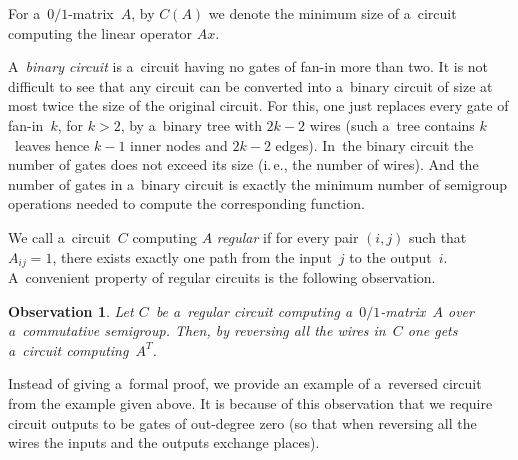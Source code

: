 \documentclass[11pt]{article}
\numberwithin{equation}{section}
\theoremstyle{definition}
\theoremstyle{plain}
\newcommand{\ie}{i.\,e.}
\theoremstyle{plain}\newtheorem{observation}[theorem]{Observation}
\begin{document}
For a~$0/1$-matrix~$A$, by $C(A)$ we denote the minimum size of
a~circuit computing the linear operator $Ax$.


A~\emph{binary circuit} is a~circuit having no gates of fan-in more than two. It
is not difficult to see that any circuit can be converted into a~binary circuit
of size at most twice the size of the original circuit.  For this, one just
replaces every gate of fan-in~$k$, for $k>2$, by a~binary tree with $2k-2$ wires
(such a~tree contains $k$~leaves hence $k-1$ inner nodes and $2k-2$ edges).
In~the binary circuit the number of gates does not exceed its size
(\ie, the number of wires). And the number of gates in a~binary
circuit is exactly the minimum number of semigroup operations needed to
compute the corresponding function.

%
%
%
%
%
%
%
We call a~circuit~$C$ computing $A$ \emph{regular} if for every pair $(i,j)$
such that $A_{ij}=1$, there exists exactly one path from the input~$j$ to the
output~$i$. A~convenient property of regular circuits is the following
observation.

%
%
%
%
\begin{observation}\label{obs:transpose}
Let $C$~be a~regular circuit computing a~$0/1$-matrix~$A$ over a~commutative
semigroup. Then, by reversing all the wires in~$C$ one gets a~circuit
computing~$A^T$.
\end{observation}

Instead of giving a~formal proof, we provide an example of a~reversed circuit
from the example given above. It is because of this observation that we require
circuit outputs to be gates of out-degree zero (so that when reversing all the
wires the inputs and the outputs exchange places).

\begin{center}
\end{center}
\end{document}
